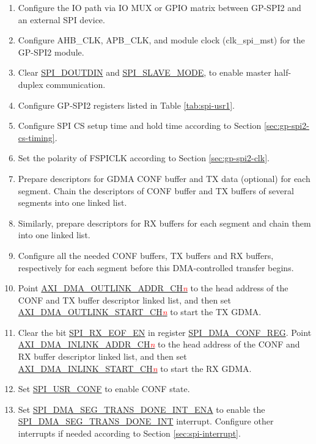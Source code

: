 \documentclass[main\_\_EN.tex]{subfiles}
\begin{document}
 \begin{enumerate}
    \item Configure the IO path via IO MUX or GPIO matrix between GP-SPI2 and an external SPI device.
    \item Configure AHB\_CLK, APB\_CLK, and module clock (clk\_spi\_mst) for the GP-SPI2 module.
    \item Clear \hyperref[fielddesc:SPIDOUTDIN]{SPI\_DOUTDIN} and \hyperref[fielddesc:SPISLAVEMODE]{SPI\_SLAVE\_MODE}, to enable master half-duplex communication.
    \item Configure GP-SPI2 registers listed in Table \ref{tab:spi-usr1}.
    \item Configure SPI CS setup time and hold time according to Section \ref{sec:gp-spi2-cs-timing}.
    \item Set the polarity of FSPICLK according to Section \ref{sec:gp-spi2-clk}.
   \item Prepare descriptors for GDMA CONF buffer and TX data (optional) for each segment. Chain the descriptors of CONF buffer and TX buffers of several segments into one linked list.
   \item Similarly, prepare descriptors for RX buffers for each segment and chain them into one linked list.
   \item Configure all the needed CONF buffers, TX buffers and RX buffers, respectively for each segment before this DMA-controlled transfer begins.
   \item Point \hyperref[fielddesc:AXIDMAOUTLINKADDRCHN]{AXI\_DMA\_OUTLINK\_ADDR\_CH\textcolor{red}{\it{n}}} to the head address of the CONF and TX buffer descriptor linked list, and then set \hyperref[fielddesc:AXIDMAOUTLINKSTARTCHN]{AXI\_DMA\_OUTLINK\_START\_CH\textcolor{red}{\it{n}}} to start the TX GDMA.
   \item Clear the bit \hyperref[fielddesc:SPIRXEOFEN]{SPI\_RX\_EOF\_EN} in register \hyperref[regdesc:SPIDMACONFREG]{SPI\_DMA\_CONF\_REG}. Point \hyperref[fielddesc:AXIDMAINLINKADDRCHN]{AXI\_DMA\_INLINK\_ADDR\_CH\textcolor{red}{\it{n}}} to the head address of the CONF and RX buffer descriptor linked list, and then set \hyperref[fielddesc:AXIDMAINLINKSTARTCHN]{AXI\_DMA\_INLINK\_START\_CH\textcolor{red}{\it{n}}} to start the RX GDMA.
   \item Set \hyperref[fielddesc:SPIUSRCONF]{SPI\_USR\_CONF} to enable CONF state.
   \item Set \hyperref[fielddesc:SPIDMASEGTRANSDONEINTENA]{SPI\_DMA\_SEG\_TRANS\_DONE\_INT\_ENA} to enable the \hyperref[int:SPIDMASEGTRANSDONEINT]{SPI\_DMA\_SEG\_TRANS\_DONE\_INT} interrupt. Configure other interrupts if needed according to Section \ref{sec:spi-interrupt}.


\end{enumerate}
\end{document}
